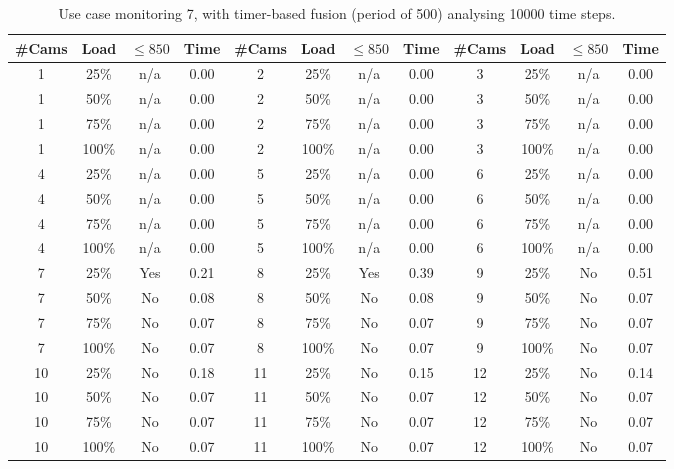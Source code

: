 \documentclass{article}
\begin{document}
\begin{table}
\centering
\begin{tabular}{|c|c|c|c|c|c|c|c|c|c|c|c|}
\hline
\#Cams & Load & $\leq 850$ & Time & \#Cams & Load & $\leq 850$ & Time & \#Cams & Load & $\leq 850$ & Time\\
\hline
1 & 25\% & n/a & 0.00 & 2 & 25\% & n/a & 0.00 & 3 & 25\% & n/a & 0.00\\
1 & 50\% & n/a & 0.00 & 2 & 50\% & n/a & 0.00 & 3 & 50\% & n/a & 0.00\\
1 & 75\% & n/a & 0.00 & 2 & 75\% & n/a & 0.00 & 3 & 75\% & n/a & 0.00\\
1 & 100\% & n/a & 0.00 & 2 & 100\% & n/a & 0.00 & 3 & 100\% & n/a & 0.00\\
\hline
4 & 25\% & n/a & 0.00 & 5 & 25\% & n/a & 0.00 & 6 & 25\% & n/a & 0.00\\
4 & 50\% & n/a & 0.00 & 5 & 50\% & n/a & 0.00 & 6 & 50\% & n/a & 0.00\\
4 & 75\% & n/a & 0.00 & 5 & 75\% & n/a & 0.00 & 6 & 75\% & n/a & 0.00\\
4 & 100\% & n/a & 0.00 & 5 & 100\% & n/a & 0.00 & 6 & 100\% & n/a & 0.00\\
\hline
7 & 25\% & Yes & 0.21 & 8 & 25\% & Yes & 0.39 & 9 & 25\% & No & 0.51\\
7 & 50\% & No & 0.08 & 8 & 50\% & No & 0.08 & 9 & 50\% & No & 0.07\\
7 & 75\% & No & 0.07 & 8 & 75\% & No & 0.07 & 9 & 75\% & No & 0.07\\
7 & 100\% & No & 0.07 & 8 & 100\% & No & 0.07 & 9 & 100\% & No & 0.07\\
\hline
10 & 25\% & No & 0.18 & 11 & 25\% & No & 0.15 & 12 & 25\% & No & 0.14\\
10 & 50\% & No & 0.07 & 11 & 50\% & No & 0.07 & 12 & 50\% & No & 0.07\\
10 & 75\% & No & 0.07 & 11 & 75\% & No & 0.07 & 12 & 75\% & No & 0.07\\
10 & 100\% & No & 0.07 & 11 & 100\% & No & 0.07 & 12 & 100\% & No & 0.07\\
\hline
\end{tabular}
\caption{Use case monitoring 7, with timer-based fusion (period of 500) analysing 10000 time steps.}
\end{table}
\end{document}
